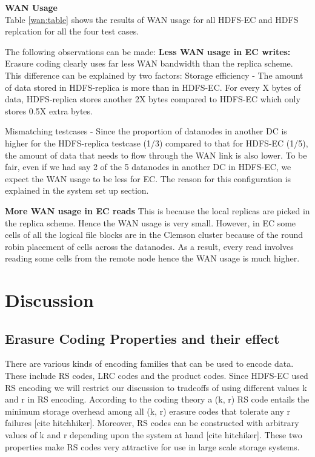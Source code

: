\documentclass{sig-alternate-05-2015}
\begin{document}
\textbf{WAN Usage} \\

Table \ref{wan:table} shows the results of WAN usage for all HDFS-EC and HDFS replcation for all the four test cases. 

The following observations can be made:
\textbf{Less WAN usage in EC writes:} Erasure coding clearly uses far less WAN bandwidth than the replica scheme. This difference can be explained by two factors:
Storage efficiency - The amount of data stored in HDFS-replica is more than in HDFS-EC. For every X bytes of data, HDFS-replica stores another 2X bytes compared to HDFS-EC which only stores 0.5X extra bytes.


Mismatching testcases - Since the proportion of datanodes in another DC is higher for the HDFS-replica testcase (1/3) compared to that for HDFS-EC (1/5), the amount of data that needs to flow through the WAN link is also lower. To be fair, even if we had say 2 of the 5 datanodes in another DC in HDFS-EC, we expect the WAN usage to be less for EC. The reason for this configuration is explained in the system set up section. 


\textbf{More WAN usage in EC reads} This is because the local replicas are picked in the replica scheme. Hence the WAN usage is very small.  However, in EC some cells of all the logical file blocks are in the Clemson cluster because of the round robin placement of cells across the datanodes. As a result, every read involves reading some cells from the remote node hence the WAN usage is much higher. 

\section{Discussion}

\subsection{Erasure Coding Properties and their effect}

There are various kinds of encoding families that can be used to encode data. These include RS codes, LRC codes and the product codes. Since HDFS-EC used RS encoding we will restrict our discussion to tradeoffs of using different values k and r in RS encoding. According to the coding theory a (k, r) RS code entails the minimum storage overhead among all (k, r) erasure codes that tolerate any r failures [cite hitchhiker]. Moreover, RS codes can be constructed with arbitrary values of k and r depending upon the system at hand [cite hitchiker]. These two properties make RS codes very attractive for use in large scale storage systems. 
\end{document}
